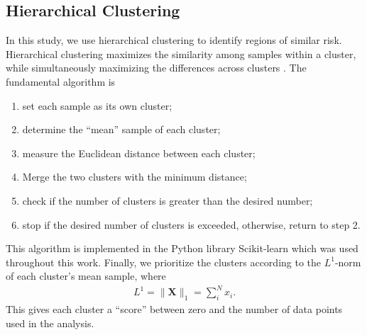 \subsection{Hierarchical Clustering}
In this study, we use hierarchical clustering to identify regions of similar risk.
Hierarchical clustering maximizes the similarity among samples within a cluster,
while simultaneously maximizing the differences across clusters \cite{karypis_chameleon_1999,
kotzur_impact_2018,rodriguez_clustering_2019}. The fundamental algorithm is
\begin{enumerate}
  \item set each sample as its own cluster;
  \item determine the ``mean'' sample of each cluster;
  \item measure the Euclidean distance between each cluster;
  \item Merge the two clusters with the minimum distance;
  \item check if the number of clusters is greater than the desired number;
  \item stop if the desired number of clusters is exceeded, otherwise, return
  to step 2.
\end{enumerate}

This algorithm is implemented in the Python library Scikit-learn \cite{scikit-learn}
which was used throughout this work.
Finally, we prioritize the clusters according to the $L^1$-norm of each cluster's
mean sample, where
\begin{eqnarray}
  L^1 = \|\mathbf{X}\|_1 = \sum_{i}^N x_i.
\end{eqnarray}
This gives each cluster a ``score'' between zero and the number of data points
used in the analysis.
